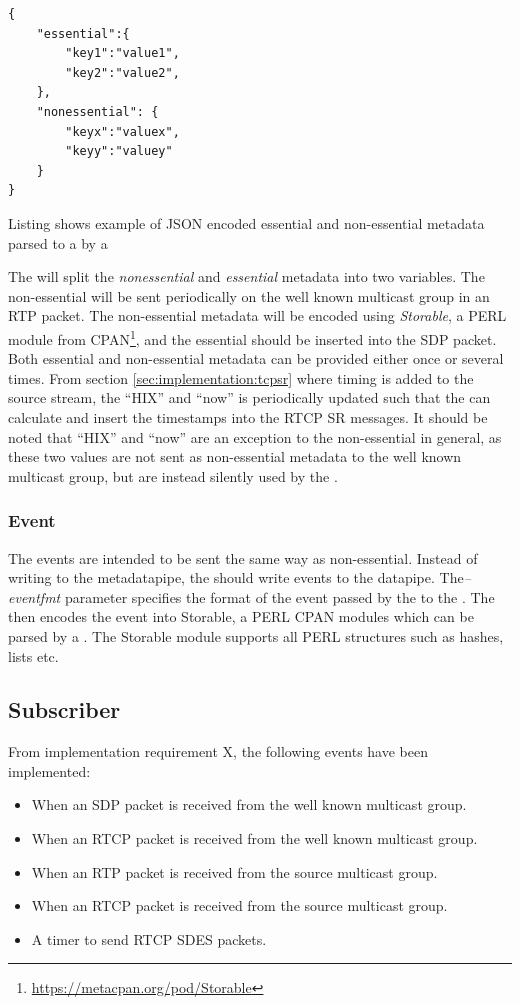 \begin{listing}[H] 
\begin{verbatim}
{
	"essential":{
		"key1":"value1",
		"key2":"value2",
	},
	"nonessential": {
		"keyx":"valuex",
		"keyy":"valuey"
	}
}
\end{verbatim}
\caption{Listing shows example of JSON encoded essential and non-essential metadata parsed to a \pub{} by a \con{}}
\label{lst:implementation:nonessess}
\end{listing}

The \pub{} will split the \textit{nonessential} and \textit{essential} metadata into two variables. The non-essential will be sent periodically on the well known multicast group in an RTP packet.
The non-essential metadata will be encoded using \textit{Storable}, a PERL module from CPAN\footnote{\url{https://metacpan.org/pod/Storable}}, and the essential should be inserted into the SDP packet.
Both essential and non-essential metadata can be provided either once or several times.  From section \ref{sec:implementation:tcpsr} where timing is added to the source stream, the ``HIX'' and ``now'' is periodically updated such that the \pub{} can calculate and insert the timestamps into the RTCP SR messages.
It should be noted that ``HIX'' and ``now'' are an exception to the non-essential in general, as these two values are not sent as non-essential metadata to the well known multicast group, but are instead silently used by the \pub{}.

\subsubsection{Event} \label{sec:implementation:events:pub}
The events are intended to be sent the same way as non-essential. Instead of writing to the metadatapipe, the \pro{} should write events to the datapipe. The\textit{--eventfmt} parameter specifies the format of the event passed by the \pro{} to the \pub{}. The \pub{} then encodes the event into Storable, a PERL CPAN modules which can be parsed by a \sub{}. The Storable module supports all PERL structures such as hashes, lists etc.


\subsection{Subscriber}
From implementation requirement X, the following events have been implemented:
\begin{itemize}
	\item When an SDP packet is received from the well known multicast group.
	\item When an RTCP packet is received from the well known multicast group.
	\item When an RTP packet is received from the source multicast group.
	\item When an RTCP packet is received from the source multicast group.
	\item A timer to send RTCP SDES packets.
\end{itemize}


